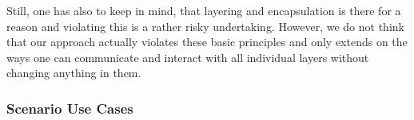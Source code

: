 Still, one has also to keep in mind, that layering and encapsulation is there for a reason and violating this is a rather risky undertaking. However, we do not think that our approach actually violates these basic principles and only extends on the ways one can communicate and interact with all individual layers without changing anything in them.



		

\subsubsection{Scenario Use Cases}

